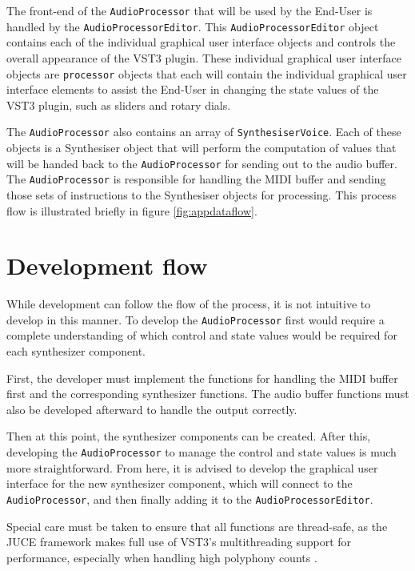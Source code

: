 \documentclass[a4paper,12pt]{report}
\begin{document}
The front-end of the \texttt{Audio\-Processor} that will be used by the End-User is handled by the \texttt{Audio\-Processor\-Editor}. This \texttt{Audio\-Processor\-Editor} object contains each of the individual graphical user interface objects and controls the overall appearance of the VST3 plugin. These individual graphical user interface objects are \texttt{processor} objects that each will contain the individual graphical user interface elements to assist the End-User in changing the state values of the VST3 plugin, such as sliders and rotary dials.

The \texttt{Audio\-Processor} also contains an array of \texttt{Synthesiser\-Voice}. Each of these objects is a Synthesiser object that will perform the computation of values that will be handed back to the \texttt{Audio\-Processor}  for sending out to the audio buffer. The \texttt{Audio\-Processor} is responsible for handling the MIDI buffer and sending those sets of instructions to the Synthesiser objects for processing. This process flow is illustrated briefly in figure \ref{fig:appdataflow}.

\section{Development flow}
\label{sec:devflow}
While development can follow the flow of the process, it is not intuitive to develop in this manner. To develop the \texttt{Audio\-Processor} first would require a complete understanding of which control and state values would be required for each synthesizer component.

First, the developer must implement the functions for handling the MIDI buffer first and the corresponding synthesizer functions. The audio buffer functions must also be developed afterward to handle the output correctly.

Then at this point, the synthesizer components can be created. After this, developing the \texttt{Audio\-Processor} to manage the control and state values is much more straightforward. From here, it is advised to develop the graphical user interface for the new synthesizer component, which will connect to the \texttt{Audio\-Processor}, and then finally adding it to the \texttt{Audio\-Processor\-Editor}.

Special care must be taken to ensure that all functions are thread-safe, as the JUCE framework makes full use of VST3's multithreading support for performance, especially when handling high polyphony counts \cite{juceclassindex}.
\end{document}
